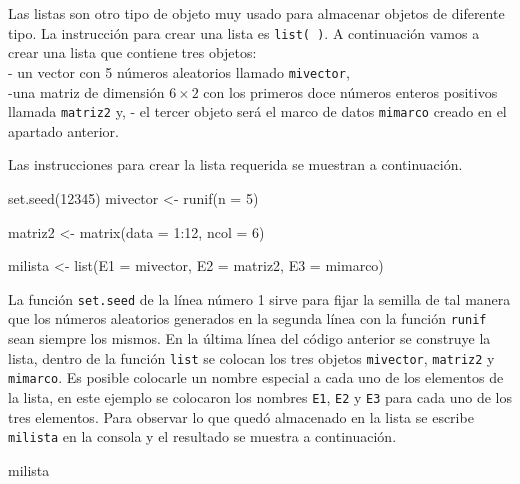 \documentclass[
]{book}
\newenvironment{Shaded}{\begin{snugshade}}{\end{snugshade}}
\newcommand{\AttributeTok}[1]{\textcolor[rgb]{0.77,0.63,0.00}{#1}}
\newcommand{\DecValTok}[1]{\textcolor[rgb]{0.00,0.00,0.81}{#1}}
\newcommand{\FunctionTok}[1]{\textcolor[rgb]{0.00,0.00,0.00}{#1}}
\newcommand{\NormalTok}[1]{#1}
\newcommand{\OtherTok}[1]{\textcolor[rgb]{0.56,0.35,0.01}{#1}}
\newcommand{\SpecialCharTok}[1]{\textcolor[rgb]{0.00,0.00,0.00}{#1}}
\begin{document}
Las listas son otro tipo de objeto muy usado para almacenar objetos de diferente tipo. La instrucción para crear una lista es \texttt{list(\ )}. A continuación vamos a crear una lista que contiene tres objetos:\\
- un vector con 5 números aleatorios llamado \texttt{mivector},\\
-una matriz de dimensión \(6 \times 2\) con los primeros doce números enteros positivos llamada \texttt{matriz2} y,
- el tercer objeto será el marco de datos \texttt{mimarco} creado en el apartado anterior.

Las instrucciones para crear la lista requerida se muestran a continuación.

\begin{Shaded}
\begin{Highlighting}[]
\FunctionTok{set.seed}\NormalTok{(}\DecValTok{12345}\NormalTok{)}
\NormalTok{mivector }\OtherTok{\textless{}{-}} \FunctionTok{runif}\NormalTok{(}\AttributeTok{n =} \DecValTok{5}\NormalTok{) }

\NormalTok{matriz2 }\OtherTok{\textless{}{-}} \FunctionTok{matrix}\NormalTok{(}\AttributeTok{data =} \DecValTok{1}\SpecialCharTok{:}\DecValTok{12}\NormalTok{, }\AttributeTok{ncol =} \DecValTok{6}\NormalTok{) }

\NormalTok{milista }\OtherTok{\textless{}{-}} \FunctionTok{list}\NormalTok{(}\AttributeTok{E1 =}\NormalTok{ mivector, }\AttributeTok{E2 =}\NormalTok{ matriz2, }\AttributeTok{E3 =}\NormalTok{ mimarco)}
\end{Highlighting}
\end{Shaded}

La función \texttt{set.seed} de la línea número 1 sirve para fijar la semilla de tal manera que los números aleatorios generados en la segunda línea con la función \texttt{runif} sean siempre los mismos. En la última línea del código anterior se construye la lista, dentro de la función \texttt{list} se colocan los tres objetos \texttt{mivector}, \texttt{matriz2} y \texttt{mimarco}. Es posible colocarle un nombre especial a cada uno de los elementos de la lista, en este ejemplo se colocaron los nombres \texttt{E1}, \texttt{E2} y \texttt{E3} para cada uno de los tres elementos. Para observar lo que quedó almacenado en la lista se escribe \texttt{milista} en la consola y el resultado se muestra a continuación.

\begin{Shaded}
\begin{Highlighting}[]
\NormalTok{milista}
\end{Highlighting}
\end{Shaded}
\end{document}
